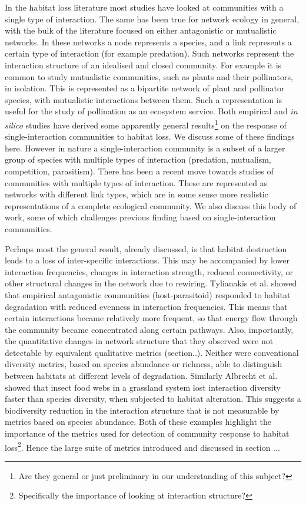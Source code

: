 \documentclass[12pt]{article}
\begin{document}
In the habitat loss literature most studies have looked at communities with a single type of interaction. The same has been true for network ecology in general, with the bulk of the literature focused on either antagonistic or mutualistic networks. In these networks a node represents a species, and a link represents a certain type of interaction (for example predation). Such networks represent the interaction structure of an idealised and closed community. For example it is common to study mutualistic communities, such as plants and their pollinators, in isolation. This is represented as a bipartite network of plant and pollinator species, with mutualistic interactions between them. Such a representation is useful for the study of pollination as an ecosystem service. Both empirical and \emph{in silico} studies have derived some apparently general results\footnote{Are they general or just preliminary in our understanding of this subject?} on the response of single-interaction communities to habitat loss. We discuss some of these findings here. However in nature a single-interaction community is a subset of a larger group of species  with multiple types of interaction (predation, mutualism, competition, parasitism). There has been a recent move towards studies of communities with multiple types of interaction. These are represented as networks with different link types, which are in some sense more realistic representations of a complete ecological community. We also discuss this body of work, some of which challenges previous finding based on single-interaction communities.   

Perhaps most the general result, already discussed, is that habitat destruction leads to a loss of inter-specific interactions. This may be accompanied by lower interaction frequencies, changes in interaction strength, reduced connectivity, or other structural changes in the network due to rewiring. Tylianakis et al. \cite{tylianakis2007habitat} showed that empirical antagonistic communities (host-parasitoid) responded to habitat degradation with reduced evenness in interaction frequencies. This means that certain interactions became relatively more frequent, so that energy flow through the community became concentrated along certain pathways. Also, importantly, the quantitative changes in network structure that they observed were not detectable by equivalent qualitative metrics (section..). Neither were conventional diversity metrics, based on species abundance or richness, able to distinguish between habitats at different levels of degradation. Similarly Albrecht et al. \cite{albrecht2007interaction} showed that insect food webs in a grassland system lost interaction diversity faster than species diversity, when subjected to habitat alteration. This suggests a biodiversity reduction in the interaction structure that is not measurable by metrics based on species abundance. Both of these examples highlight the importance of the metrics used for detection of community response to habitat loss\footnote{Specifically the importance of looking at interaction structure?}. Hence the large suite of metrics introduced and discussed in section ... 
\end{document}
